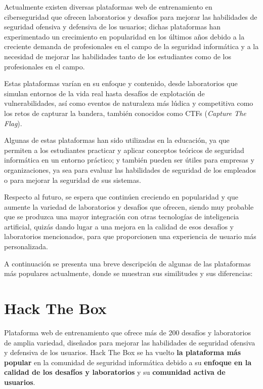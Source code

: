     Actualmente existen diversas plataformas web de entrenamiento en ciberseguridad que ofrecen laboratorios y desafíos para mejorar las habilidades de seguridad ofensiva y defensiva de los usuarios; dichas plataformas han experimentado un crecimiento en popularidad en los últimos años debido a la creciente demanda de profesionales en el campo de la seguridad informática y a la necesidad de mejorar las habilidades tanto de los estudiantes como de los profesionales en el campo.
    
    Estas plataformas varían en su enfoque y contenido, desde laboratorios que simulan entornos de la vida real hasta desafíos de explotación de vulnerabilidades, así como eventos de naturaleza más lúdica y competitiva como los retos de capturar la bandera, también conocidos como CTFs (\textit{Capture The Flag}).
    
    Algunas de estas plataformas han sido utilizadas en la educación, ya que permiten a los estudiantes practicar y aplicar conceptos teóricos de seguridad informática en un entorno práctico; y también pueden ser útiles para empresas y organizaciones, ya sea para evaluar las habilidades de seguridad de los empleados o para mejorar la seguridad de sus sistemas.
    
    Respecto al futuro, se espera que continúen creciendo en popularidad y que aumente la variedad de laboratorios y desafíos que ofrecen, siendo muy probable que se produzca una mayor integración con otras tecnologías de inteligencia artificial, quizás dando lugar a una mejora en la calidad de esos desafíos y laboratorios mencionados, para que proporcionen una experiencia de usuario más personalizada.
    
    A continuación se presenta una breve descripción de algunas de las plataformas más populares actualmente, donde se muestran sus similitudes y sus diferencias:
    
    \newpage
    
    
    \section{Hack The Box}
    
        Plataforma web de entrenamiento que ofrece más de 200 desafíos y laboratorios de amplia variedad, diseñados para mejorar las habilidades de seguridad ofensiva y defensiva de los usuarios. Hack The Box se ha vuelto \textbf{la plataforma más popular} en la comunidad de seguridad informática debido a su \textbf{enfoque en la calidad de los desafíos y laboratorios} y su \textbf{comunidad activa de usuarios}.
        

